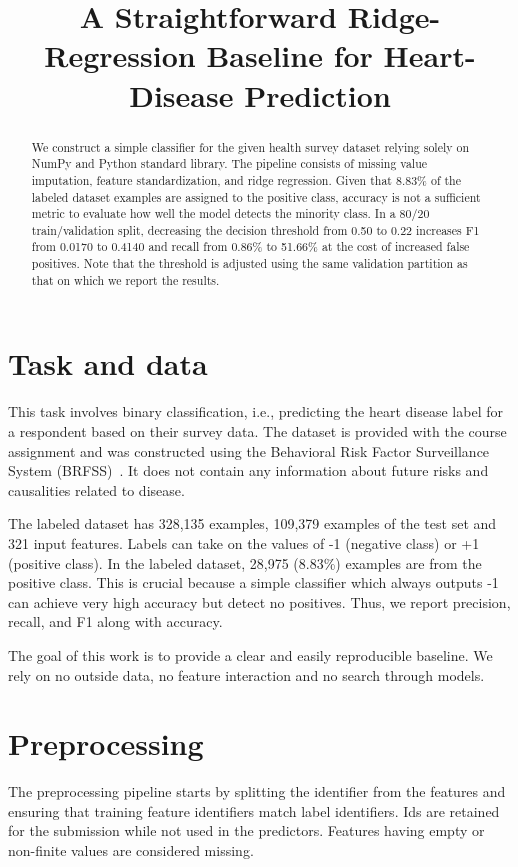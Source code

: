 \documentclass[10pt,conference,compsocconf]{IEEEtran}
\title{A Straightforward Ridge-Regression Baseline for Heart-Disease Prediction}
\author{\IEEEauthorblockN{EPFL CS-433 - Project 1}
\IEEEauthorblockA{Machine Learning, Fall 2026}}
\date{}
\begin{document}
\maketitle

\begin{abstract}
We construct a simple classifier for the given health survey dataset relying solely on NumPy and Python standard library. The pipeline consists of missing value imputation, feature standardization, and ridge regression. Given that 8.83\% of the labeled dataset examples are assigned to the positive class, accuracy is not a sufficient metric to evaluate how well the model detects the minority class. In a 80/20 train/validation split, decreasing the decision threshold from 0.50 to 0.22 increases F1 from 0.0170 to 0.4140 and recall from 0.86\% to 51.66\% at the cost of increased false positives. Note that the threshold is adjusted using the same validation partition as that on which we report the results.

\end{abstract}

\section{Task and data}
This task involves binary classification, i.e., predicting the heart disease label for a respondent based on their survey data. The dataset is provided with the course assignment and was constructed using the Behavioral Risk Factor Surveillance System (BRFSS)~\cite{assignment}. It does not contain any information about future risks and causalities related to disease.

The labeled dataset has 328,135 examples, 109,379 examples of the test set and 321 input features. Labels can take on the values of -1 (negative class) or +1 (positive class). In the labeled dataset, 28,975 (8.83\%) examples are from the positive class. This is crucial because a simple classifier which always outputs -1 can achieve very high accuracy but detect no positives. Thus, we report precision, recall, and F1 along with accuracy.

The goal of this work is to provide a clear and easily reproducible baseline. We rely on no outside data, no feature interaction and no search through models.

\section{Preprocessing}
The preprocessing pipeline starts by splitting the identifier from the features and ensuring
that training feature identifiers match label identifiers. Ids are retained for the
submission while not used in the predictors. Features having empty or non-finite
values are considered missing.
\end{document}
